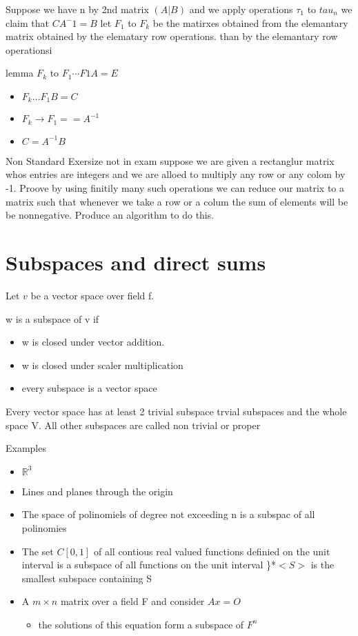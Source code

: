 \documentclass[twocolumn]{article}
\providecommand{\tightlist}{%
  \setlength{\itemsep}{0pt}\setlength{\parskip}{0pt}}
\begin{document}
Suppose we have n by 2nd matrix \((A |B)\) and we apply operations
\(\tau_1\) to \(tau_n\) we claim that \(C A^-1= B\) let \(F_1\) to
\(F_k\) be the matirxes obtained from the elemantary matrix obtained by
the elematary row operations. than by the elemantary row operationsi

lemma \(F_k\) to \(F_1\cdots F1A=E\)

\begin{itemize}
\tightlist
\item
  \(F_k \dots F_1 B = C\)
\item
  \(F_k \to F_1 == A^{-1}\)
\item
  \(C = A^{-1}B\)
\end{itemize}

Non Standard Exersize not in exam suppose we are given a rectanglur
matrix whos entries are integers and we are alloed to multiply any row
or any colom by -1. Proove by using finitily many such operations we can
reduce our matrix to a matrix such that whenever we take a row or a
colum the sum of elements will be be nonnegative. Produce an algorithm
to do this.

\hypertarget{subspaces-and-direct-sums}{%
\section{Subspaces and direct sums}\label{subspaces-and-direct-sums}}

Let \(v\) be a vector space over field f.

w is a subspace of v if

\begin{itemize}
\tightlist
\item
  w is closed under vector addition.
\item
  w is closed under scaler multiplication
\item
  every subspace is a vector space
\end{itemize}

Every vector space has at least 2 trivial subspace trvial subspaces and
the whole space V. All other subspaces are called non trivial or proper

Examples

\begin{itemize}
\tightlist
\item
  \(\mathbb{R}^3\)
\item
  Lines and planes through the origin
\item
  The space of polinomiels of degree not exceeding n is a subspac of all
  polinomies
\item
  The set \(C[0,1]\) of all contious real valued functions definied on
  the unit interval is a subspace of all functions on the unit interval
  \}*\(<S>\) is the smallest subspace containing S
\item
  A \(m \times n\) matrix over a field F and consider \(Ax=O\)

  \begin{itemize}
  \tightlist
  \item
    the solutions of this equation form a subspace of \(F^n\)
  \end{itemize}
\end{itemize}
\end{document}
